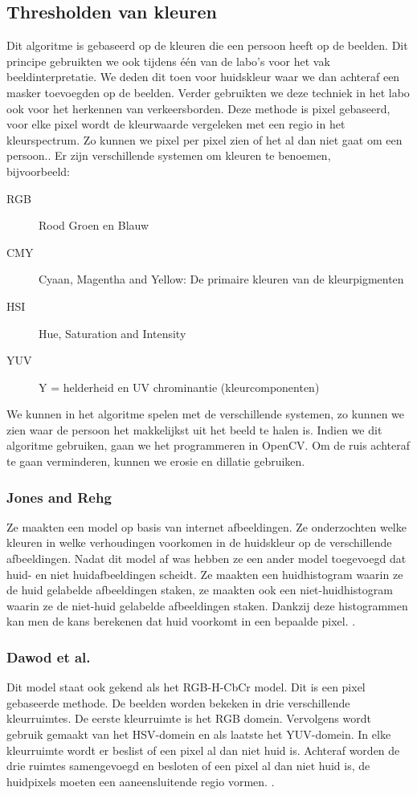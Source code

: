 \subsection{Thresholden van kleuren}
\label{refTVK}
Dit algoritme is gebaseerd op de kleuren die een persoon heeft op de beelden. Dit principe gebruikten we ook tijdens \'e\'en van de labo's voor het vak beeldinterpretatie. We deden dit toen voor huidskleur waar we dan achteraf een masker toevoegden op de beelden. Verder gebruikten we deze techniek in het labo ook voor het herkennen van verkeersborden. Deze methode is pixel gebaseerd, voor elke pixel wordt de kleurwaarde vergeleken met een regio in het kleurspectrum. Zo kunnen we pixel per pixel zien of het al dan niet gaat om een persoon.\cite{bibTHK}. Er zijn verschillende systemen om kleuren te benoemen,\\ bijvoorbeeld:
\begin{description}
	\item[RGB] Rood Groen en Blauw
	\item [CMY] Cyaan, Magentha and Yellow: De primaire kleuren van de kleurpigmenten
	\item [HSI] Hue, Saturation and Intensity
	\item [YUV] Y = helderheid en UV chrominantie (kleurcomponenten)
\end{description}
We kunnen in het algoritme spelen met de verschillende systemen, zo kunnen we zien waar de persoon het makkelijkst uit het beeld te halen is. Indien we dit algoritme gebruiken, gaan we het programmeren in OpenCV. Om de ruis achteraf te gaan verminderen, kunnen we erosie en dillatie gebruiken.
 

\subsubsection{Jones and Rehg}
Ze maakten een model op basis van internet afbeeldingen. Ze onderzochten welke kleuren in welke verhoudingen voorkomen in de huidskleur op de verschillende afbeeldingen. Nadat dit model af was hebben ze een ander model toegevoegd dat huid- en niet huidafbeeldingen scheidt. Ze maakten een huidhistogram waarin ze de huid gelabelde afbeeldingen staken, ze maakten ook een niet-huidhistogram waarin ze de niet-huid gelabelde afbeeldingen staken. Dankzij deze histogrammen kan men de kans berekenen dat huid voorkomt in een bepaalde pixel. \cite{bibTHK}.

\subsubsection{Dawod et al.}
Dit model staat ook gekend als het RGB-H-CbCr model. Dit is een pixel gebaseerde methode. De beelden worden bekeken in drie verschillende kleurruimtes. De eerste kleurruimte is het RGB domein. Vervolgens wordt gebruik gemaakt van het HSV-domein en als laatste het YUV-domein. In elke kleurruimte wordt er beslist of een pixel al dan niet huid is. Achteraf worden de drie ruimtes samengevoegd en besloten of een pixel al dan niet huid is, de huidpixels moeten een aaneensluitende regio vormen. \cite{bibTHK}.

